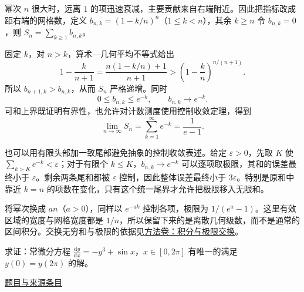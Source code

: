\documentclass[12pt,fontset=fandol]{ctexart}
\begin{document}
\begin{solve}\label{ans:fin08-lo:8}

幂次 $n$ 很大时，远离 $1$ 的项迅速衰减，主要贡献来自右端附近。因此把指标改成距右端的网格数，定义 $b_{n,k}=(1-k/n)^n$（$1\leq k<n$），其余 $k\geq n$ 令 $b_{n,k}=0$，则 $S_n=\sum_{k\geq1}b_{n,k}$。

固定 $k$，对 $n>k$，算术---几何平均不等式给出
\[
1-\frac{k}{n+1}=\frac{n(1-k/n)+1}{n+1}>\left(1-\frac{k}{n}\right)^{n/(n+1)}.
\]
所以 $b_{n+1,k}>b_{n,k}$，从而 $S_n$ 严格递增。同时
\[
0\leq b_{n,k}\leq e^{-k},\qquad b_{n,k}\longrightarrow e^{-k}.
\]
可和上界既证明有界性，也允许对计数测度使用控制收敛定理，得到
\[
\lim_{n\to\infty}S_n=\sum_{k=1}^\infty e^{-k}=\frac1{e-1}.
\]

也可以用有限头部加一致尾部避免抽象的控制收敛表述。给定 $\varepsilon>0$，先取 $K$ 使 $\sum_{k>K}e^{-k}<\varepsilon$；对于有限个 $k\le K$，$b_{n,k}\to e^{-k}$ 可以逐项取极限，其和的误差最终小于 $\varepsilon$。剩余两条尾和都被 $\varepsilon$ 控制，因此整体误差最终小于 $3\varepsilon$。特别是原和中靠近 $k=n$ 的项数在变化，只有这个统一尾界才允许把极限移入无限和。

\end{solve}

\begin{remark}[方法与条件]将幂次换成 $an$（$a>0$），同样以 $e^{-ak}$ 控制各项，极限为 $1/(e^a-1)$。这里有效区域的宽度与网格宽度都是 $1/n$，所以保留下来的是离散几何级数，而不是通常的区间积分。交换无穷和与极限的依据见\hyperref[app:integration-exchange]{方法卷：积分与极限交换}。\end{remark}

\begin{example}\label{ex:fin08-lo:9}\label{pr:fin08-lo:9}

求证：常微分方程 $\frac{\mathrm{d}y}{\mathrm{d}x}=-y^{3}+\sin x$，$x\in[0,2\pi]$ 有唯一的满足 $y(0)=y(2\pi)$ 的解。

\par\href{https://github.com/lzxcr/cmc-mathematics/blob/64916fa1fdbc3e444a652eca204d5669058ee321/src/problems/finals/08/10.md}{题目与来源条目}

\end{example}
\end{document}
